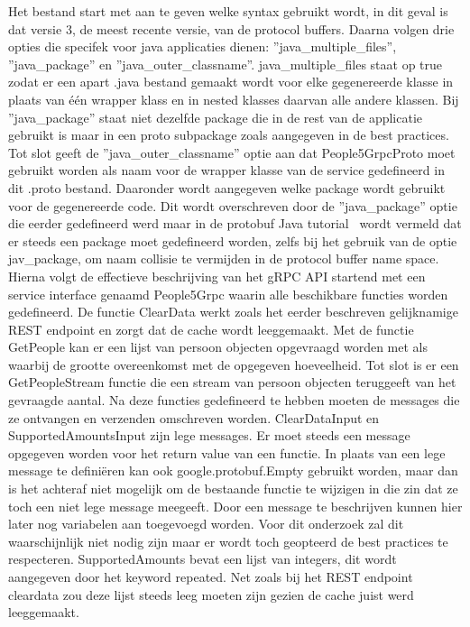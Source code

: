 Het bestand start met aan te geven welke syntax gebruikt wordt, in dit geval is dat versie 3, de meest recente versie, van de protocol buffers.
Daarna volgen drie opties die specifek voor java applicaties dienen: ''java\_multiple\_files'', ''java\_package'' en ''java\_outer\_classname''.
java\_multiple\_files staat op true zodat er een apart .java bestand gemaakt wordt voor elke gegenereerde klasse in plaats
van één wrapper klass en in nested klasses daarvan alle andere klassen. Bij ''java\_package'' staat niet dezelfde package die in de rest van de applicatie gebruikt is
maar in een proto subpackage zoals aangegeven in de best practices.
Tot slot geeft de ''java\_outer\_classname'' optie aan dat People5GrpcProto moet gebruikt worden als naam voor de wrapper klasse van de service gedefineerd in dit .proto bestand.
Daaronder wordt aangegeven welke package wordt gebruikt voor de gegenereerde code. Dit wordt overschreven door de ''java\_package'' optie die eerder gedefineerd werd maar
in de protobuf Java tutorial~\parencite{protobufJava} wordt vermeld dat er steeds een package moet gedefineerd worden, zelfs bij het gebruik van de optie jav\_package, om naam collisie
te vermijden in de protocol buffer name space. Hierna volgt de effectieve beschrijving van het gRPC API startend met een service interface genaamd People5Grpc waarin
alle beschikbare functies worden gedefineerd. De functie ClearData werkt zoals het eerder beschreven gelijknamige REST endpoint en zorgt dat de cache wordt leeggemaakt.
Met de functie GetPeople kan er een lijst van persoon objecten opgevraagd worden met als waarbij de grootte overeenkomst met de opgegeven hoeveelheid.
Tot slot is er een GetPeopleStream functie die een stream van persoon objecten teruggeeft van het gevraagde aantal.
Na deze functies gedefineerd te hebben moeten de messages die ze ontvangen en verzenden omschreven worden.
ClearDataInput en SupportedAmountsInput zijn lege messages. Er moet steeds een message opgegeven worden voor het return value van een functie.
In plaats van een lege message te defini\"eren kan ook google.protobuf.Empty gebruikt worden, maar dan is het achteraf niet mogelijk om de bestaande functie
te wijzigen in die zin dat ze toch een niet lege message meegeeft. Door een message te beschrijven kunnen hier later nog variabelen aan toegevoegd worden.
Voor dit onderzoek zal dit waarschijnlijk niet nodig zijn maar er wordt toch geopteerd de best practices te respecteren.
SupportedAmounts bevat een lijst van integers, dit wordt aangegeven door het keyword repeated.
Net zoals bij het REST endpoint cleardata zou deze lijst steeds leeg moeten zijn gezien de cache juist werd leeggemaakt.
